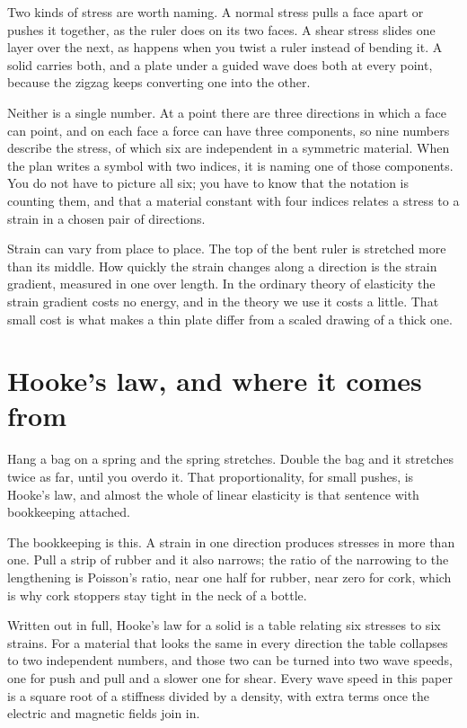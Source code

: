 \documentclass[11pt]{article}
\begin{document}
Two kinds of stress are worth naming. A normal stress pulls a face apart or pushes it together, as the ruler
does on its two faces. A shear stress slides one layer over the next, as happens when you twist a ruler instead
of bending it. A solid carries both, and a plate under a guided wave does both at every point, because the
zigzag keeps converting one into the other.

Neither is a single number. At a point there are three directions in which a face can point, and on each face
a force can have three components, so nine numbers describe the stress, of which six are independent in a
symmetric material. When the plan writes a symbol with two indices, it is naming one of those components. You
do not have to picture all six; you have to know that the notation is counting them, and that a material
constant with four indices relates a stress to a strain in a chosen pair of directions.

Strain can vary from place to place. The top of the bent ruler is stretched more than its middle. How quickly
the strain changes along a direction is the strain gradient, measured in one over length. In the ordinary
theory of elasticity the strain gradient costs no energy, and in the theory we use it costs a little. That
small cost is what makes a thin plate differ from a scaled drawing of a thick one.

\section{Hooke's law, and where it comes from}

Hang a bag on a spring and the spring stretches. Double the bag and it stretches twice as far, until you
overdo it. That proportionality, for small pushes, is Hooke's law, and almost the whole of linear elasticity is
that sentence with bookkeeping attached.

The bookkeeping is this. A strain in one direction produces stresses in more than one. Pull a strip of rubber
and it also narrows; the ratio of the narrowing to the lengthening is Poisson's ratio, near one half for
rubber, near zero for cork, which is why cork stoppers stay tight in the neck of a bottle.

Written out in full, Hooke's law for a solid is a table relating six stresses to six strains. For a material
that looks the same in every direction the table collapses to two independent numbers, and those two can be
turned into two wave speeds, one for push and pull and a slower one for shear. Every wave speed in this paper
is a square root of a stiffness divided by a density, with extra terms once the electric and magnetic fields
join in.
\end{document}
